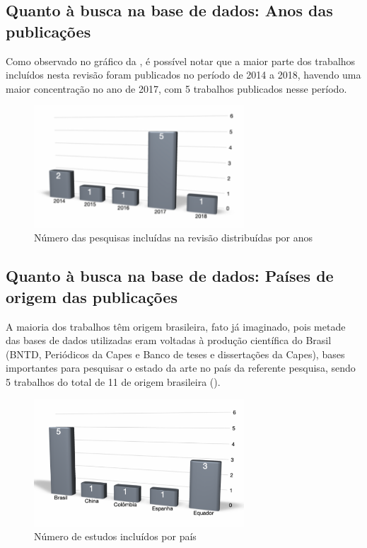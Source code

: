\documentclass{textolivre}
\begin{document}
\subsection*{Quanto à busca na base de dados: Anos das publicações}
Como observado no gráfico da , é possível notar que a maior parte dos trabalhos incluídos nesta revisão foram publicados no período de 2014 a 2018, havendo uma maior concentração no ano de 2017, com 5 trabalhos publicados nesse período. 

\begin{figure}[htbp]
 \centering
 \includegraphics[width=0.7\textwidth]{fig3.png}
 \caption{Número das pesquisas incluídas na revisão distribuídas por anos}
 \label{fig3}
\end{figure}

\subsection*{Quanto à busca na base de dados: Países de origem das publicações}
A maioria dos trabalhos têm origem brasileira, fato já imaginado, pois metade das bases de dados utilizadas eram voltadas à produção científica do Brasil (BNTD, Periódicos da Capes e Banco de teses e dissertações da Capes), bases importantes para pesquisar o estado da arte no país da referente pesquisa, sendo 5 trabalhos do total de 11 de origem brasileira (). 

\begin{figure}[htbp]
 \centering
 \includegraphics[width=0.7\textwidth]{fig4.png}
 \caption{Número de estudos incluídos por país}
 \label{fig4}
\end{figure}
\end{document}
